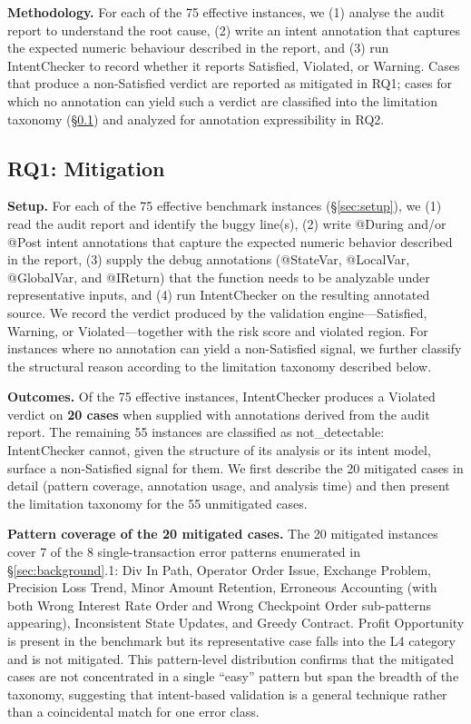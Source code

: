 \documentclass[pdflatex,sn-basic]{sn-jnl}%
\theoremstyle{thmstyleone}%
\theoremstyle{thmstyletwo}%
\theoremstyle{thmstylethree}%
\begin{document}
\smallskip\noindent\textbf{Methodology.}
For each of the 75 effective instances, we (1) analyse the audit report to understand the root cause,
(2) write an intent annotation that captures the expected numeric behaviour described in the report,
and (3) run IntentChecker to record whether it reports Satisfied, Violated, or Warning.
Cases that produce a non-Satisfied verdict are reported as mitigated in RQ1; cases for which no annotation can yield such a verdict are classified into the limitation taxonomy (§\ref{sec:rq1}) and analyzed for annotation expressibility in RQ2.

\subsection{RQ1: Mitigation}\label{sec:rq1}

\noindent\textbf{Setup.}
For each of the 75 effective benchmark instances (§\ref{sec:setup}), we (1) read the audit report and identify the buggy line(s), (2) write @During and/or @Post intent annotations that capture the expected numeric behavior described in the report, (3) supply the debug annotations (@StateVar, @LocalVar, @GlobalVar, and @IReturn) that the function needs to be analyzable under representative inputs, and (4) run IntentChecker on the resulting annotated source.
We record the verdict produced by the validation engine---Satisfied, Warning, or Violated---together with the risk score and violated region.
For instances where no annotation can yield a non-Satisfied signal, we further classify the structural reason according to the limitation taxonomy described below.

\smallskip
\noindent\textbf{Outcomes.}
Of the 75 effective instances, IntentChecker produces a Violated verdict on \textbf{20 cases} when supplied with annotations derived from the audit report.
The remaining 55 instances are classified as not\_detectable: IntentChecker cannot, given the structure of its analysis or its intent model, surface a non-Satisfied signal for them.
We first describe the 20 mitigated cases in detail (pattern coverage, annotation usage, and analysis time) and then present the limitation taxonomy for the 55 unmitigated cases.

\smallskip
\noindent\textbf{Pattern coverage of the 20 mitigated cases.}
The 20 mitigated instances cover 7 of the 8 single-transaction error patterns enumerated in §\ref{sec:background}.1: Div In Path, Operator Order Issue, Exchange Problem, Precision Loss Trend, Minor Amount Retention, Erroneous Accounting (with both Wrong Interest Rate Order and Wrong Checkpoint Order sub-patterns appearing), Inconsistent State Updates, and Greedy Contract.
Profit Opportunity is present in the benchmark but its representative case falls into the L4 category and is not mitigated.
This pattern-level distribution confirms that the mitigated cases are not concentrated in a single ``easy'' pattern but span the breadth of the taxonomy, suggesting that intent-based validation is a general technique rather than a coincidental match for one error class.
\end{document}
